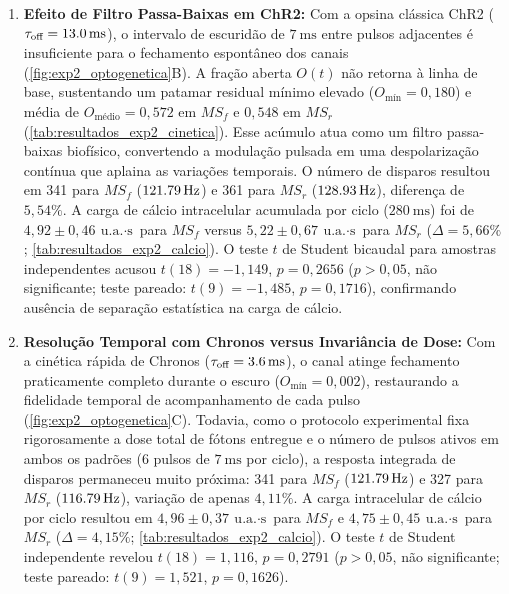 \documentclass[11pt,a4paper,article,brazil]{abntex2}
\begin{document}
\begin{enumerate}
    \item \textbf{Efeito de Filtro Passa-Baixas em ChR2:} Com a opsina clássica ChR2 ($\tau_{\text{off}} = \qty{13{,}0}{\milli\second}$), o intervalo de escuridão de $\qty{7}{\milli\second}$ entre pulsos adjacentes é insuficiente para o fechamento espontâneo dos canais (\cref{fig:exp2_optogenetica}B). A fração aberta $O(t)$ não retorna à linha de base, sustentando um patamar residual mínimo elevado ($O_{\text{mín}} = 0{,}180$) e média de $O_{\text{médio}} = 0{,}572$ em $MS_f$ e $0{,}548$ em $MS_r$ (\cref{tab:resultados_exp2_cinetica}). Esse acúmulo atua como um filtro passa-baixas biofísico, convertendo a modulação pulsada em uma despolarização contínua que aplaina as variações temporais. O número de disparos resultou em 341 para $MS_f$ ($\qty{121{,}79}{\hertz}$) e 361 para $MS_r$ ($\qty{128{,}93}{\hertz}$), diferença de $5{,}54\%$. A carga de cálcio intracelular acumulada por ciclo ($\qty{280}{\milli\second}$) foi de $4{,}92 \pm 0{,}46\ \unit{\text{u.a.}\cdot\second}$ para $MS_f$ versus $5{,}22 \pm 0{,}67\ \unit{\text{u.a.}\cdot\second}$ para $MS_r$ ($\Delta = 5{,}66\%$; \cref{tab:resultados_exp2_calcio}). O teste $t$ de Student bicaudal para amostras independentes acusou $t(18) = -1{,}149$, $p = 0{,}2656$ ($p > 0{,}05$, não significante; teste pareado: $t(9) = -1{,}485$, $p = 0{,}1716$), confirmando ausência de separação estatística na carga de cálcio.
    \item \textbf{Resolução Temporal com Chronos versus Invariância de Dose:} Com a cinética rápida de Chronos ($\tau_{\text{off}} = \qty{3{,}6}{\milli\second}$), o canal atinge fechamento praticamente completo durante o escuro ($O_{\text{mín}} = 0{,}002$), restaurando a fidelidade temporal de acompanhamento de cada pulso (\cref{fig:exp2_optogenetica}C). Todavia, como o protocolo experimental fixa rigorosamente a dose total de fótons entregue e o número de pulsos ativos em ambos os padrões (6 pulsos de $\qty{7}{\milli\second}$ por ciclo), a resposta integrada de disparos permaneceu muito próxima: 341 para $MS_f$ ($\qty{121{,}79}{\hertz}$) e 327 para $MS_r$ ($\qty{116{,}79}{\hertz}$), variação de apenas $4{,}11\%$. A carga intracelular de cálcio por ciclo resultou em $4{,}96 \pm 0{,}37\ \unit{\text{u.a.}\cdot\second}$ para $MS_f$ e $4{,}75 \pm 0{,}45\ \unit{\text{u.a.}\cdot\second}$ para $MS_r$ ($\Delta = 4{,}15\%$; \cref{tab:resultados_exp2_calcio}). O teste $t$ de Student independente revelou $t(18) = 1{,}116$, $p = 0{,}2791$ ($p > 0{,}05$, não significante; teste pareado: $t(9) = 1{,}521$, $p = 0{,}1626$).

\end{enumerate}
\end{document}
